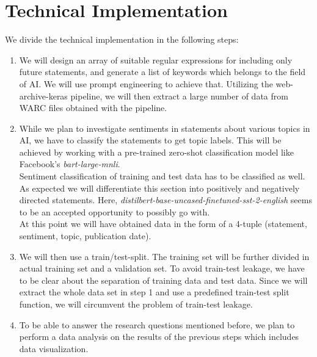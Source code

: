 \documentclass{article}
\begin{document}
\section{Technical Implementation}
We divide the technical implementation in the following steps:

\begin{enumerate}
\item We will design an array of suitable regular expressions for including only future statements, and generate a list of keywords which belongs to the field of AI.
We will use prompt engineering to achieve that.
Utilizing the web-archive-keras pipeline, we will then extract a large number of data from WARC files obtained with the pipeline.

\item While we plan to investigate sentiments in statements about various topics in AI, we have to classify the statements to get topic labels.
This will be achieved by working with a pre-trained zero-shot classification model like Facebook’s \textit{bart-large-mnli}.
\\
Sentiment classification of training and test data has to be classified as well.
As expected we will differentiate this section into positively and negatively directed statements.
Here, \textit{distilbert-base-uncased-finetuned-sst-2-english} seems to be an accepted opportunity to possibly go with.
\\
At this point we will have obtained data in the form of a 4-tuple (statement, sentiment, topic, publication date).

\item We will then use a train/test-split.
The training set will be further divided in actual training set and a validation set.
To avoid train-test leakage, we have to be clear about the separation of training data and test data.
Since we will extract the whole data set in step 1 and use a predefined train-test split function, we will circumvent the problem of train-test leakage.

\item To be able to answer the research questions mentioned before, we plan to perform a data analysis on the results of the previous steps which includes data visualization.
\end{enumerate}
\end{document}
